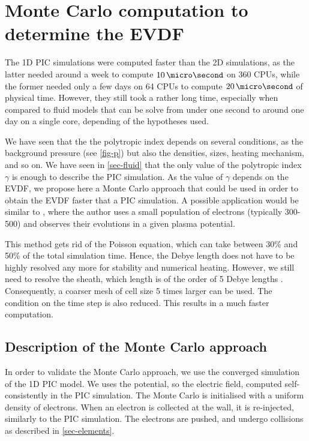 
\section{Monte Carlo computation to determine the EVDF}
\label{sec-MCM}
  
  The \ac{1D} \ac{PIC} simulations were computed faster than the \ac{2D} simulations, as the latter needed around a week to compute $10\,\micro\second$ on 360 CPUs, while the former needed only a few days on 64 CPUs to compute $20\,\micro\second$ of physical time.
  However, they still took a rather long time, especially when compared to fluid models that can be solve from under one second to around one day on a single core, depending of the hypotheses used.
  
  We have seen that the the polytropic index depends on several conditions, as the background pressure (see \cref{fig-p}) but also the densities, sizes, heating mechanism, and so on.
  We have seen in \cref{sec-fluid} that the only value of the polytropic index $\gamma$ is enough to describe the \ac{PIC} simulation.
  As the value of $\gamma$ depends on the \ac{EVDF}, we propose here a Monte Carlo approach that could be used in order to obtain the \ac{EVDF} faster that a \ac{PIC} simulation.
  A possible application would be similar to \citet{kushner1983}, where the author uses a small population of electrons (typically 300-500) and observes their evolutions in a given plasma potential.
  
  This method gets rid of the Poisson equation, which can take between 30\% and 50\% of the total simulation time.
  Hence, the Debye length does not have to be highly resolved any more for stability and numerical heating.
  However, we still need to resolve the sheath, which length is of the order of 5 Debye lengths \citep{chabert2014}.
  Consequently, a coarser mesh of cell size 5 times larger can be used.
  The condition on the time step is also reduced.
  This results in a much faster computation.

  \subsection{Description of the Monte Carlo approach}

    In order to validate the Monte Carlo approach, we use the converged simulation of the \ac{1D} \ac{PIC} model.
    We uses the potential, so the electric field, computed self-consistently in the \ac{PIC} simulation.
    The Monte Carlo is initialised with a uniform density of electrons.
    When an electron is collected at the wall, it is re-injected, similarly to the \ac{PIC} simulation.
    The electrons are pushed, and undergo collisions as described in \cref{sec-elements}.

